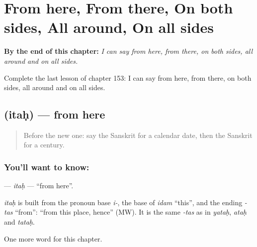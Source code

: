 
\chapter{From here, From there, On both sides, All around, On all sides}
\label{ch:sa-from-here-from-there-on-both-sides-all-around-on-all-sides}

\begin{chapteropening}
\textbf{By the end of this chapter:} \emph{I can say from here, from there, on both sides, all around and on all sides.}

Complete the last lesson of chapter 153: I can say from here, from there, on both sides, all around and on all sides.
\end{chapteropening}

\section[\texorpdfstring{\sk{इतः} (itaḥ)}{इतः (itaḥ)}]{ (itaḥ) — from here}

\label{lesson:SA-C153-itah}



\begin{quote}
Before the new one: say the Sanskrit for a calendar date, then the Sanskrit for a century.
\end{quote}

\subsection*{You'll want to know: }
\textbf{} — \emph{itaḥ} — \textquotedblleft{}from here\textquotedblright{}.

\begin{cousinweb}
\emph{itaḥ} is built from the pronoun base \emph{i-}, the base of \emph{idam} \textquotedblleft{}this\textquotedblright{}, and the ending \emph{-tas} \textquotedblleft{}from\textquotedblright{}: \textquotedblleft{}from this place, hence\textquotedblright{} (MW). It is the same \emph{-tas} as in \emph{yataḥ}, \emph{ataḥ} and \emph{tataḥ}.
\end{cousinweb}

\begin{grammarlens}[title={What you've built}]
One more word for this chapter.
\end{grammarlens}

